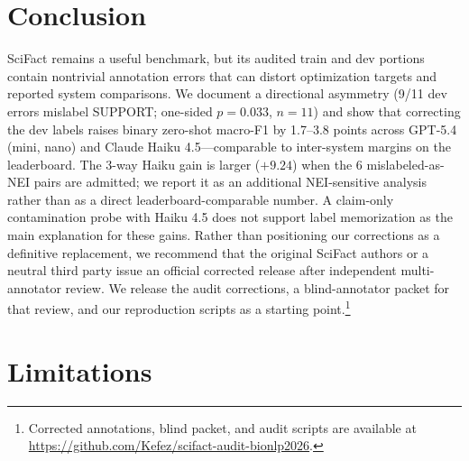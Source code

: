 \documentclass[11pt]{article}
\begin{document}
\section{Conclusion}

SciFact remains a useful benchmark, but its audited train and dev portions contain nontrivial annotation errors that can distort optimization targets and reported system comparisons.
We document a directional asymmetry (9/11 dev errors mislabel SUPPORT; one-sided $p{=}0.033$, $n{=}11$) and show that correcting the dev labels raises binary zero-shot macro-F1 by 1.7--3.8 points across GPT-5.4 (mini, nano) and Claude Haiku 4.5---comparable to inter-system margins on the leaderboard.
The 3-way Haiku gain is larger ($+9.24$) when the 6 mislabeled-as-NEI pairs are admitted; we report it as an additional NEI-sensitive analysis rather than as a direct leaderboard-comparable number.
A claim-only contamination probe with Haiku 4.5 does not support label memorization as the main explanation for these gains.
Rather than positioning our corrections as a definitive replacement, we recommend that the original SciFact authors or a neutral third party issue an official corrected release after independent multi-annotator review.
We release the audit corrections, a blind-annotator packet for that review, and our reproduction scripts as a starting point.\footnote{Corrected annotations, blind packet, and audit scripts are available at \url{https://github.com/Kefez/scifact-audit-bionlp2026}.}

\section*{Limitations}
\end{document}
